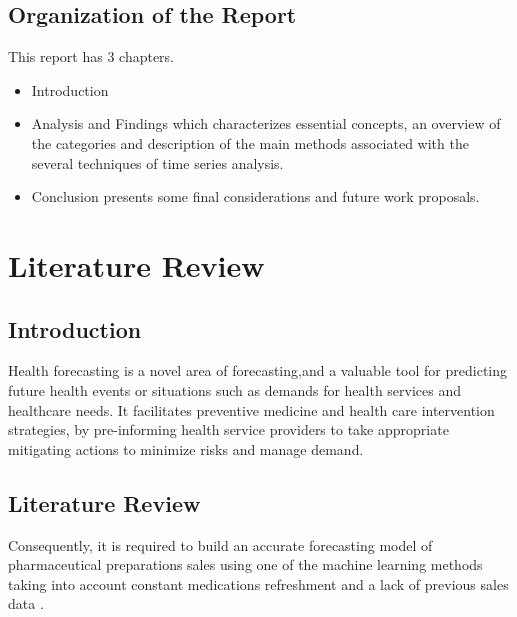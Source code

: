 \documentclass[12pt]{report}
\begin{document}
\section{Organization of the Report}

This report has 3 chapters. 

\begin{itemize}
	
	\item   Introduction
	\item   Analysis and Findings which characterizes essential concepts, an overview of the categories and description of the main methods associated with the several techniques of time series analysis.
	\item 	Conclusion presents some final considerations and future work proposals.
\end{itemize}
















\chapter{Literature Review}

\section{Introduction}




Health forecasting is a novel area of forecasting,and a valuable tool for predicting future health
events or situations such as demands for health services and healthcare needs. It facilitates
preventive medicine and health care intervention strategies, by pre-informing health service
providers to take appropriate mitigating actions to minimize risks and manage demand.


\section{Literature Review}

Consequently, it is required to build an accurate forecasting model of pharmaceutical preparations sales using one of the machine learning methods taking into account constant medications refreshment and a lack of previous sales data \cite{1}.
\end{document}
